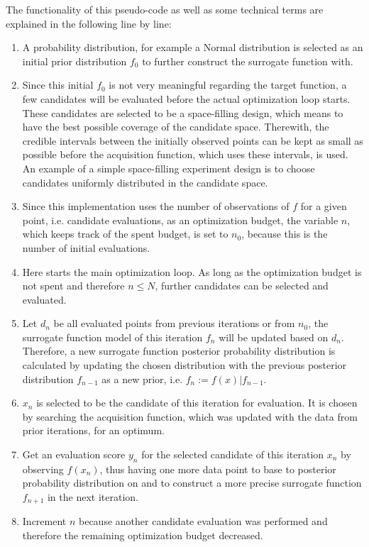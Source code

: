 The functionality of this pseudo-code as well as some technical terms are explained in the following line by line:
\begin{enumerate}
    \item A probability distribution, for example a Normal distribution is selected as an initial prior distribution $f_0$ to further construct the surrogate function with.
    \item Since this initial $f_0$ is not very meaningful regarding the target function, a few candidates will be evaluated before the actual optimization loop starts.
    These candidates are selected to be a space-filling design, which means to have the best possible coverage of the candidate space.
    Therewith, the credible intervals between the initially observed points can be kept as small as possible before the acquisition function, which uses these intervals, is used.
    An example of a simple space-filling experiment design is to choose candidates uniformly distributed in the candidate space.
    \item Since this implementation uses the number of observations of $f$ for a given point, i.e. candidate evaluations, as an optimization budget, the variable $n$, which keeps track of the spent budget, is set to $n_0$, because this is the number of initial evaluations.
    \item Here starts the main optimization loop.
    As long as the optimization budget is not spent and therefore $n \leq N$, further candidates can be selected and evaluated.
    \item Let $d_n$ be all evaluated points from previous iterations or from $n_0$, the surrogate function model of this iteration $f_n$ will be updated based on $d_n$.
    Therefore, a new surrogate function posterior probability distribution is calculated by updating the chosen distribution with the previous posterior distribution $f_{n-1}$ as a new prior, i.e. $f_n := f(x)|f_{n-1}$.
    \item $x_n$ is selected to be the candidate of this iteration for evaluation. It is chosen by searching the acquisition function, which was updated with the data from prior iterations, for an optimum.
    \item Get an evaluation score $y_n$ for the selected candidate of this iteration $x_n$ by observing $f(x_n)$, thus having one more data point to base to posterior probability distribution on and to construct a more precise surrogate function $f_{n+1}$ in the next iteration.
    \item Increment $n$ because another candidate evaluation was performed and therefore the remaining optimization budget decreased.

\end{enumerate}
